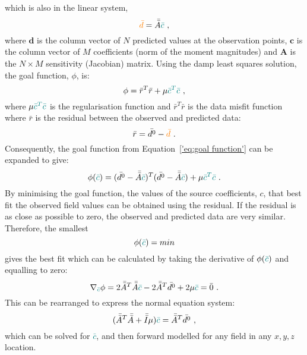 which is also in the linear system,
\begin{equation}
    \textcolor{orange}{\bar{d}} = \bar{\bar{A}} \textcolor{teal}{\bar{c}}
    \ ,
\end{equation}
where $\mathbf{d}$ is the column vector of $N$ predicted values at the observation points, $\mathbf{c}$ is the column vector of $M$ coefficients (norm of the moment magnitudes) and $\mathbf{A}$ is the $N \times M$ sensitivity (Jacobian) matrix. Using the damp least squares solution, the goal function, $\phi$, is:
\begin{equation}
\label{'eq:goal function'}
    \phi = \bar{r}^T\bar{r} + \mu \textcolor{teal}{\bar{c}^T\bar{c}}
    \ ,
\end{equation}
where $\mu \textcolor{teal}{\bar{c}^T\bar{c}}$ is the regularisation function and  $\bar{r}^T\bar{r}$ is the data misfit function where $\bar{r}$ is the residual between the observed and predicted data:
\begin{equation}
    \bar{r} = \bar{d^0} - \textcolor{orange}{\bar{d}}
    \ .
\end{equation}
Consequently, the goal function from Equation~\ref{'eq:goal function'} can  be expanded to give:
\begin{equation}
    \phi (\textcolor{teal}{\bar{c}}) = (\bar{d^0} - \Bar{\Bar{A}} \textcolor{teal}{\Bar{c}})^T (\bar{d^0} - \Bar{\Bar{A}} \textcolor{teal}{\Bar{c}}) + \mu \textcolor{teal}{\bar{c}^T\bar{c}}
    \ .
\end{equation}
By minimising the goal function, the values of the source coefficients, $c$, that best fit the observed field values can be obtained using the residual. If the residual is as close as possible to zero, the observed and predicted data are very similar. Therefore, the smallest
\begin{equation}
    \phi(\textcolor{teal}{\bar{c}}) = min
\end{equation}
gives the best fit which can be calculated by taking the derivative of $\phi(\textcolor{teal}{\bar{c}})$ and equalling to zero:
\begin{equation}
    \nabla_{\textcolor{teal}{\bar{c}}} \phi = 2 \Bar{\Bar{A}}^T \Bar{\Bar{A}} \textcolor{teal}{\Bar{c}} - 2\Bar{\Bar{A}}^T\bar{d^0} + 2\mu \textcolor{teal}{\bar{c}} = \bar{0}
    \ .
\end{equation}
This can be rearranged to express the normal equation system:
\begin{equation}
    (\Bar{\Bar{A}}^T \Bar{\Bar{A}} + \Bar{\Bar{I}} \mu ) \textcolor{teal}{\bar{c}} = 
    \Bar{\Bar{A}}^T\bar{d^0}
    \ ,
\end{equation}
which can be solved for \textcolor{teal}{$\bar{c}$}, and then forward modelled for any field in any $x, y, z$ location.


